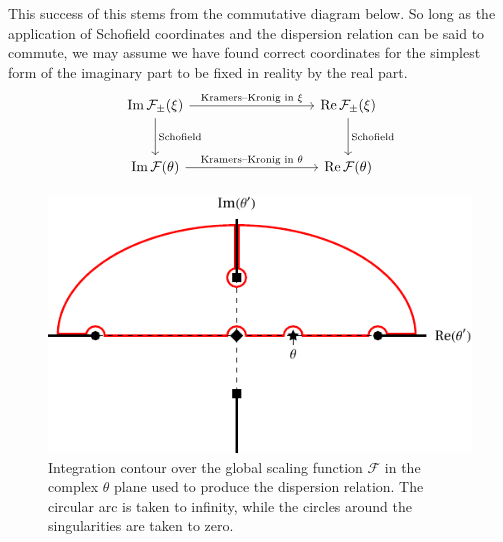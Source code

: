 \documentclass[
  aps,
  pre,
  preprint,
  longbibliography,
  floatfix
]{revtex4-2}
\begin{document}
This success of this stems from the commutative diagram below. So long as the
application of Schofield coordinates and the dispersion relation can be said to
commute, we may assume we have found correct coordinates for the simplest form
of the imaginary part to be fixed in reality by the real part.
\[
  \begin{tikzcd}[row sep=large, column sep = 9em]
  \operatorname{Im}\mathcal F_\pm(\xi) \arrow{r}{\text{Kramers--Kronig in $\xi$}} \arrow[]{d}{\text{Schofield}} & \operatorname{Re}\mathcal F_{\pm}(\xi) \arrow{d}{\text{Schofield}} \\%
  \operatorname{Im}\mathcal F(\theta) \arrow{r}{\text{Kramers--Kronig in $\theta$}}& \operatorname{Re}\mathcal F(\theta)
\end{tikzcd}
\]

\begin{figure}
  \includegraphics{figs/contour_path.pdf}
  \caption{
    Integration contour over the global scaling function $\mathcal F$ in the
    complex $\theta$ plane used to produce the dispersion relation. The
    circular arc is taken to infinity, while the circles around the
    singularities are taken to zero.
  } \label{fig:contour}
\end{figure}
\end{document}
